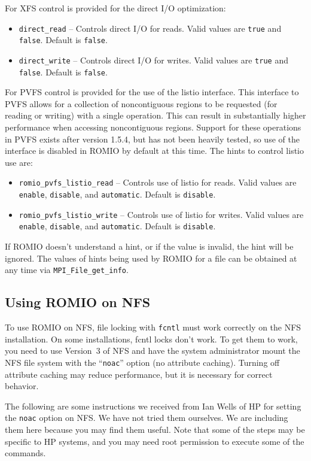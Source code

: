 For XFS control is provided for the direct I/O optimization:
\begin{itemize}
\item \texttt{direct\_read} -- Controls direct I/O for reads.  Valid
values are \texttt{true} and \texttt{false}.  Default is \texttt{false}.
\item \texttt{direct\_write} -- Controls direct I/O for writes.  Valid
values are \texttt{true} and \texttt{false}.  Default is \texttt{false}.
\end{itemize}

For PVFS control is provided for the use of the listio interface.  This
interface to PVFS allows for a collection of noncontiguous regions to be
requested (for reading or writing) with a single operation.  This can result
in substantially higher performance when accessing noncontiguous regions.
Support for these operations in PVFS exists after version 1.5.4, but has not
been heavily tested, so use of the interface is disabled in ROMIO by default
at this time.  The hints to control listio use are:
\begin{itemize}
\item \texttt{romio\_pvfs\_listio\_read} -- Controls use of listio for reads.
Valid values are \texttt{enable}, \texttt{disable}, and \texttt{automatic}.
Default is \texttt{disable}.
\item \texttt{romio\_pvfs\_listio\_write} -- Controls use of listio for writes.
Valid values are \texttt{enable}, \texttt{disable}, and \texttt{automatic}.
Default is \texttt{disable}.
\end{itemize}

If ROMIO doesn't understand a hint, or if the value is invalid, the hint
will be ignored. The values of hints being used by ROMIO for a file
can be obtained at any time via {\tt MPI\_File\_get\_info}.

\subsection{Using ROMIO on NFS}
To use ROMIO on NFS, file locking with {\tt fcntl} must work correctly on
the NFS installation. On some installations, fcntl locks don't work.
To get them to work, you need to use Version~3 of NFS and 
have the system administrator mount the NFS file system with the 
``{\tt noac}'' option (no attribute caching). Turning off attribute caching 
may reduce performance, but it is necessary for correct behavior.

The following are some instructions we received from Ian Wells of HP
for setting the {\tt noac} option on NFS. We have not tried them
ourselves. We are including them here because you may find 
them useful. Note that some of the steps may be specific to HP
systems, and you may need root permission to execute some of the
commands. 

